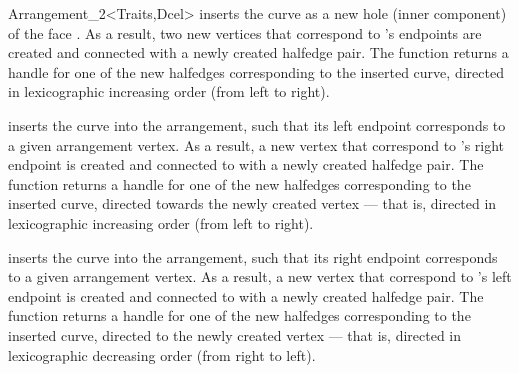 \begin{ccRefClass}{Arrangement_2<Traits,Dcel>}
   {inserts the curve  as a new hole (inner component) of the face
    . As a result, two new vertices that correspond to 's
    endpoints are created and connected with a newly created halfedge pair.
    The function returns a handle for one of the new halfedges
    corresponding to the inserted curve, directed in lexicographic
    increasing order (from left to right).
    }

  {inserts the curve  into the arrangement, such that its left
   endpoint corresponds to a given arrangement vertex. As a result, a new
   vertex that correspond to 's right endpoint is created and
   connected to  with a newly created halfedge pair. 
   The function returns a handle for one of the new halfedges corresponding
   to the inserted curve, directed towards the newly created vertex ---
   that is, directed in lexicographic increasing order (from left to right).
   }

  {inserts the curve  into the arrangement, such that its right
   endpoint corresponds to a given arrangement vertex. As a result, a new
   vertex that correspond to 's left endpoint is created and
   connected to  with a newly created halfedge pair. 
   The function returns a handle for one of the new halfedges corresponding
   to the inserted curve, directed to the newly created vertex ---
   that is, directed in lexicographic decreasing order (from right to left).
   }


\end{ccRefClass}
